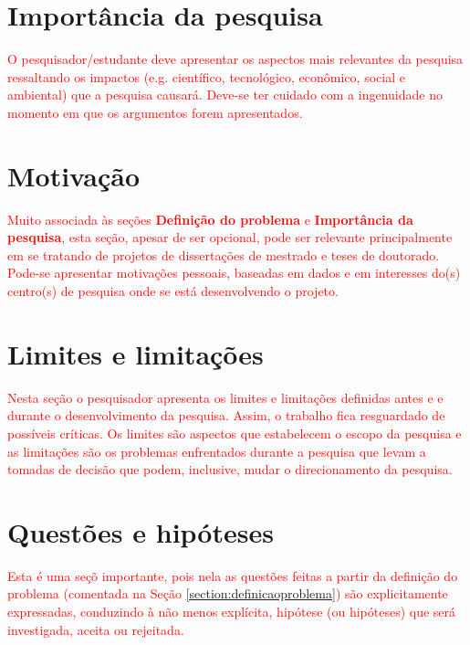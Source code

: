 \section{Import\^ancia da pesquisa}
\label{section:importanciapesquisa}

\textcolor{red}{O pesquisador/estudante deve apresentar os aspectos mais relevantes da pesquisa ressaltando os impactos (e.g. cient\'ifico, tecnol\'ogico, econ\^omico, social e ambiental) que a pesquisa causar\'a. Deve-se ter cuidado com a ingenuidade no momento em que os argumentos forem apresentados.}



\section{Motiva\c{c}\~ao}
\label{section:motivacao}

\textcolor{red}{Muito associada \`as se\c{c}\~oes \textbf{Defini\c{c}\~ao do problema} e \textbf{Import\^ancia da pesquisa}, esta se\c{c}\~ao, apesar de ser opcional, pode ser relevante principalmente em se tratando de projetos de disserta\c{c}\~oes de mestrado e teses de doutorado. Pode-se apresentar motiva\c{c}\~oes pessoais, baseadas em dados e em interesses do(s) centro(s) de pesquisa onde se est\'a desenvolvendo o projeto.}



\section{Limites e limita\c{c}\~oes}
\label{section:limiteslimitacoes}

\textcolor{red}{Nesta se\c{c}\~ao o pesquisador apresenta os limites e limita\c{c}\~oes definidas antes e e durante o desenvolvimento da pesquisa. Assim, o trabalho fica resguardado de poss\'iveis cr\'iticas. Os limites s\~ao aspectos que estabelecem o escopo da pesquisa e as limita\c{c}\~oes s\~ao os problemas enfrentados durante a pesquisa que levam a tomadas de decis\~ao que podem, inclusive, mudar o direcionamento da pesquisa.}



\section{Quest\~oes e hip\'oteses}
\label{section:questoeshipoteses}

\textcolor{red}{Esta \'e uma se\c{c}\~o importante, pois nela as quest\~oes feitas a partir da defini\c{c}\~ao do problema (comentada na Se\c{c}\~ao \ref{section:definicaoproblema}) s\~ao explicitamente expressadas, conduzindo \`a n\~ao menos expl\'icita, hip\'otese (ou hip\'oteses) que ser\'a investigada, aceita ou rejeitada.}



